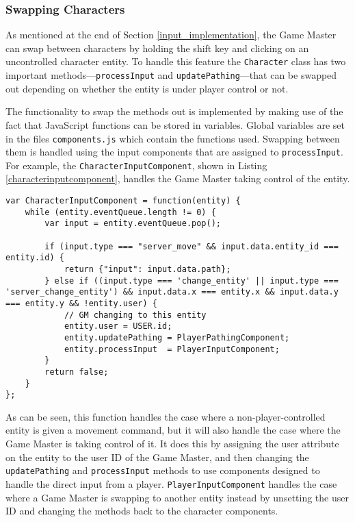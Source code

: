 \subsubsection{Swapping Characters}
As mentioned at the end of Section \ref{input_implementation}, the Game Master can swap between characters by holding the shift key and clicking on an uncontrolled character entity. To handle this feature the \texttt{Character} class has two important methods---\texttt{processInput} and \texttt{updatePathing}---that can be swapped out depending on whether the entity is under player control or not.

The functionality to swap the methods out is implemented by making use of the fact that JavaScript functions can be stored in variables. Global variables are set in the files \texttt{components.js} which contain the functions used. Swapping between them is handled using the input components that are assigned to \texttt{processInput}. For example, the \texttt{CharacterInputComponent}, shown in Listing \ref{characterinputcomponent}, handles the Game Master taking control of the entity.

\noindent
\begin{minipage}{\linewidth}
\begin{lstlisting}[style=js, caption={Input component for handling server input applied to non-player-controlled characters.}, label=characterinputcomponent]
var CharacterInputComponent = function(entity) {
    while (entity.eventQueue.length != 0) {
        var input = entity.eventQueue.pop();

        if (input.type === "server_move" && input.data.entity_id === entity.id) {
            return {"input": input.data.path};
        } else if ((input.type === 'change_entity' || input.type === 'server_change_entity') && input.data.x === entity.x && input.data.y === entity.y && !entity.user) {
            // GM changing to this entity
            entity.user = USER.id;
            entity.updatePathing = PlayerPathingComponent;
            entity.processInput  = PlayerInputComponent;
        }
        return false;
    }
};
\end{lstlisting}
\end{minipage}

As can be seen, this function handles the case where a non-player-controlled entity is given a movement command, but it will also handle the case where the Game Master is taking control of it. It does this by assigning the user attribute on the entity to the user ID of the Game Master, and then changing the \texttt{updatePathing} and \texttt{processInput} methods to use components designed to handle the direct input from a player. \texttt{PlayerInputComponent} handles the case where a Game Master is swapping to another entity instead by unsetting the user ID and changing the methods back to the character components.

